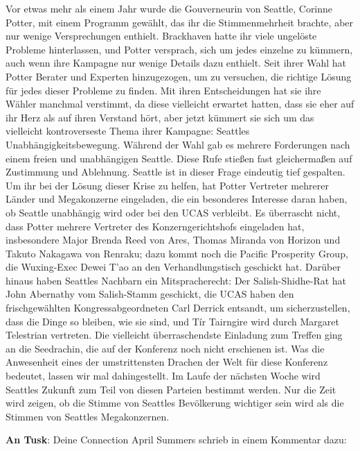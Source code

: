 Vor etwas mehr als einem Jahr wurde die Gouverneurin von Seattle, Corinne Potter, mit einem Programm gewählt, das ihr die Stimmenmehrheit brachte, aber nur wenige Versprechungen enthielt. Brackhaven hatte ihr viele ungelöste Probleme hinterlassen, und Potter versprach, sich um jedes einzelne zu kümmern, auch wenn ihre Kampagne nur wenige Details dazu enthielt. Seit ihrer Wahl hat Potter Berater und Experten hinzugezogen, um zu versuchen, die richtige Lösung für jedes dieser Probleme zu finden. Mit ihren Entscheidungen hat sie ihre Wähler manchmal verstimmt, da diese vielleicht erwartet hatten, dass sie eher auf ihr Herz als auf ihren Verstand hört, aber jetzt kümmert sie sich um das vielleicht kontroverseste Thema ihrer Kampagne: Seattles Unabhängigkeitsbewegung. 
Während der Wahl gab es mehrere Forderungen nach einem freien und unabhängigen Seattle. Diese Rufe stießen fast gleichermaßen auf Zustimmung und Ablehnung. Seattle ist in dieser Frage eindeutig tief gespalten. Um ihr bei der Lösung dieser Krise zu helfen, hat Potter Vertreter mehrerer Länder und Megakonzerne eingeladen, die ein besonderes Interesse daran haben, ob Seattle unabhängig wird oder bei den UCAS verbleibt.
Es überrascht nicht, dass Potter mehrere Vertreter des Konzerngerichtshofs eingeladen hat, insbesondere Major Brenda Reed von Ares, Thomas Miranda von Horizon und Takuto Nakagawa von Renraku; dazu kommt noch die Pacific Prosperity Group, die Wuxing-Exec Dewei T’ao an den Verhandlungstisch geschickt hat. Darüber hinaus haben Seattles Nachbarn ein Mitspracherecht: Der Salish-Shidhe-Rat hat John Abernathy vom Salish-Stamm geschickt, die UCAS haben den frischgewählten Kongressabgeordneten Carl Derrick entsandt, um sicherzustellen, dass die Dinge so bleiben, wie sie sind, und Tír Tairngire wird durch Margaret Telestrian vertreten. Die vielleicht überraschendste Einladung zum Treffen ging an die Seedrachin, die auf der Konferenz noch nicht erschienen ist. Was die Anwesenheit eines der umstrittensten Drachen der Welt für diese Konferenz bedeutet, lassen wir mal dahingestellt. 
Im Laufe der nächsten Woche wird Seattles Zukunft zum Teil von diesen Parteien bestimmt werden. Nur die Zeit wird zeigen, ob die Stimme von Seattles Bevölkerung wichtiger sein wird als die Stimmen von Seattles Megakonzernen.

\vspace{1em}
\textbf{An Tusk}: Deine Connection April Summers schrieb in einem Kommentar dazu: 



